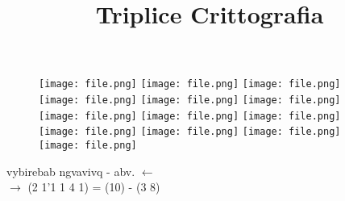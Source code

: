 \documentclass{article}
\title{Triplice Crittografia}
\date{}
\begin{document}
\maketitle
\thispagestyle{empty}
\begin{center}
\begin{figure}[H]
\centering
\texttt{[image: file.png]}
\texttt{[image: file.png]}
\texttt{[image: file.png]}
\texttt{[image: file.png]}
\texttt{[image: file.png]}
\texttt{[image: file.png]}
\texttt{[image: file.png]}
\texttt{[image: file.png]}
\texttt{[image: file.png]}
\texttt{[image: file.png]}
\texttt{[image: file.png]}
\texttt{[image: file.png]}
\texttt{[image: file.png]}
\end{figure}
\end{center}
\begin{center}
vybirebab ngvavivq - {\color{blue}abv.}   $\leftarrow$\\
\vspace{1cm}
$\rightarrow$  {\color{blue} (2 1'1 1 4 1) = (10)} - (3 8)
\end{center}
\end{document}
